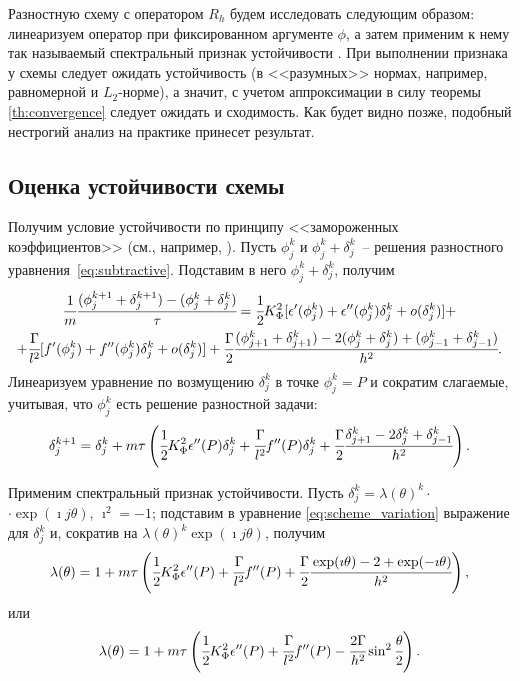 Разностную схему с оператором $R_h$ будем исследовать следующим образом: линеаризуем оператор при фиксированном аргументе $\phi$, а затем применим к нему так называемый спектральный признак устойчивости \cite{bahvalov_computational_methods}. При выполнении признака у схемы следует ожидать устойчивость (в <<разумных>> нормах, например, равномерной и $L_2$-норме), а значит, с учетом аппроксимации в силу теоремы \ref{th:convergence} следует ожидать и сходимость. Как будет видно позже, подобный нестрогий анализ на практике принесет результат.


\subsection{Оценка устойчивости схемы}

Получим условие устойчивости по принципу <<замороженных коэффициентов>> (см., например, \cite{bahvalov_computational_methods}). Пусть $\phi_j^k$ и $\phi_j^k + \delta_j^k$~-- решения разностного уравнения~\eqref{eq:subtractive}. Подставим в него $\phi_j^k + \delta_j^k$, получим
\begin{multline*}
	\cfrac{1}{m} \cfrac{(\phi_j^{k + 1} + \delta_j^{k + 1}) - (\phi_j^k + \delta_j^k)}{\tau} = \cfrac{1}{2} K_\Phi^2 [\epsilon'(\phi_j^k) + \epsilon''(\phi_j^k) \delta_j^k + o(\delta_j^k)] + \\ + \cfrac{\Gamma}{l^2} [f'(\phi_j^k) + f''(\phi_j^k) \delta_j^k + o(\delta_j^k)] + \cfrac{\Gamma}{2} \cfrac{(\phi_{j + 1}^k + \delta_{j + 1}^k) - 2 (\phi_j^k + \delta_j^k) + (\phi_{j - 1}^k + \delta_{j - 1}^k)}{h^2} {\text{.}}
\end{multline*}
Линеаризуем уравнение по возмущению $\delta_j^k$ в точке $\phi_j^k = P$ и сократим слагаемые, учитывая, что $\phi_j^k$ есть решение разностной задачи:
\begin{equation}
	\delta_j^{k + 1} = \delta_j^k + m \tau \left( \cfrac{1}{2} K_\Phi^2 \epsilon''(P) \delta_j^k + \cfrac{\Gamma}{l^2} f''(P) \delta_j^k + \cfrac{\Gamma}{2} \cfrac{{\delta}_{j + 1}^k - 2 {\delta}_j^k + {\delta}_{j - 1}^k}{h^2} \right) {\text{.}}
	\label{eq:scheme_variation}
\end{equation} 

Применим спектральный признак устойчивости. Пусть $\delta_j^k = \lambda(\theta)^k \cdot$ \linebreak $\cdot \exp(\imath j \theta)$, $\imath^2 = -1$; подставим в уравнение \eqref{eq:scheme_variation} выражение для $\delta_j^k$ и, сократив на $\lambda(\theta)^k \exp(\imath j \theta)$, получим
$$\lambda(\theta) = 1 + m \tau \left( \cfrac{1}{2} K_\Phi^2 \epsilon''(P) + \cfrac{\Gamma}{l^2} f''(P) + \cfrac{\Gamma}{2} \cfrac{\exp(\imath \theta) - 2 + \exp(-\imath \theta)}{h^2} \right) {\text{,}}$$
или
\begin{equation}
	\lambda(\theta) = 1 + m \tau \left( \cfrac{1}{2} K_\Phi^2 \epsilon''(P) + \cfrac{\Gamma}{l^2} f''(P) - \cfrac{2 \Gamma}{h^2} \sin^2 \cfrac{\theta}{2} \right) {\text{.}}
	\label{eq:spectral}
\end{equation}


